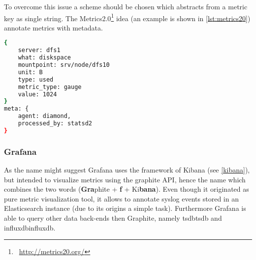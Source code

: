 To overcome this issue a scheme should be chosen which abstracts from a metric key as single string.
The Metrics2.0\footnote{\Mundus~\url{http://metrics20.org/}} idea (an example is shown in \autoref{lst:metrics20}) annotate metrics with metadata.

\begin{lstlisting}[language=bash,
    caption={Metrics2.0 formatted metric},
    label={lst:metrics20}]
{
    server: dfs1
    what: diskspace
    mountpoint: srv/node/dfs10
    unit: B
    type: used
    metric_type: gauge
    value: 1024
}
meta: {
    agent: diamond,
    processed_by: statsd2
}
\end{lstlisting}

\subsubsection{Grafana}
As the name might suggest Grafana uses the framework of Kibana (see \ref{kibana}),
but intended to visualize metrics using the \gls{graphite} API,
hence the name which combines the two words (\textbf{Gra}phite + \textbf{f} + Ki\textbf{bana}).
Even though it originated as pure metric visualization tool, it allows to annotate syslog events stored in an Elasticsearch instance (due to its origins a simple task).
Furthermore Grafana is able to query other data back-ends then Graphite, namely \gls{tsdb}\glsdesc{tsdb} and \gls{influxdb}\glsdesc{influxdb}.
